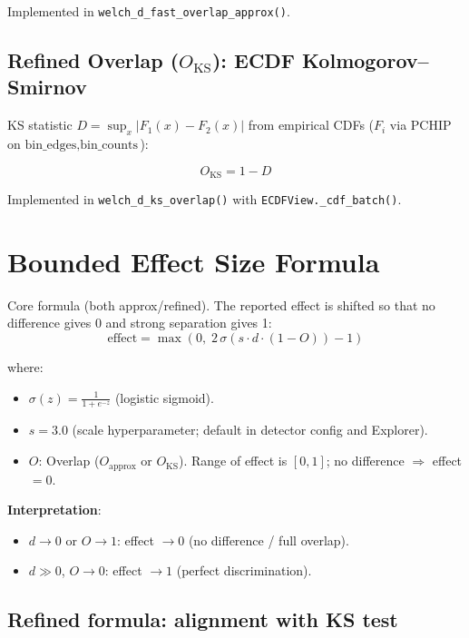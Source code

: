 \documentclass{article}
\begin{document}
Implemented in \texttt{welch\_d\_fast\_overlap\_approx()}.

\subsection{Refined Overlap ($O_\text{KS}$): ECDF Kolmogorov--Smirnov}

KS statistic $D = \sup_x |F_1(x) - F_2(x)|$ from empirical CDFs ($F_i$ via PCHIP on $\text{bin\_edges}, \text{bin\_counts}$):

\begin{equation}
    O_\text{KS} = 1 - D
    \label{eq:ks_overlap}
\end{equation}

Implemented in \texttt{welch\_d\_ks\_overlap()} with \texttt{ECDFView.\_cdf\_batch()}.

\section{Bounded Effect Size Formula}

Core formula (both approx/refined). The reported effect is shifted so that no difference gives 0 and strong separation gives 1:
\begin{equation}
    \text{effect} = \max\left(0,\; 2\,\sigma\left( s \cdot d \cdot (1 - O) \right) - 1\right)
    \label{eq:bounded_effect}
\end{equation}

where:
\begin{itemize}
    \item $\sigma(z) = \frac{1}{1 + e^{-z}}$ (logistic sigmoid).
    \item $s = 3.0$ (scale hyperparameter; default in detector config and Explorer).
    \item $O$: Overlap ($O_\text{approx}$ or $O_\text{KS}$). Range of effect is $[0,1]$; no difference $\Rightarrow$ effect $= 0$.
\end{itemize}

\textbf{Interpretation}:
\begin{itemize}
    \item $d \to 0$ or $O \to 1$: effect $\to 0$ (no difference / full overlap).
    \item $d \gg 0$, $O \to 0$: effect $\to 1$ (perfect discrimination).
\end{itemize}

\subsection{Refined formula: alignment with KS test}
\end{document}
